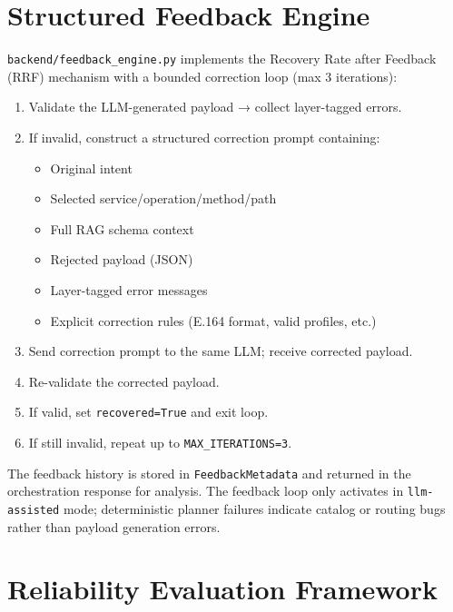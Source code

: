 \documentclass[conference]{IEEEtran}
\begin{document}
\section{Structured Feedback Engine}
\label{sec:feedback}

\texttt{backend/feedback\_engine.py} implements the Recovery Rate after
Feedback (RRF) mechanism with a bounded correction loop (max 3 iterations):

\begin{enumerate}[leftmargin=1.5em]
  \item Validate the LLM-generated payload → collect layer-tagged errors.
  \item If invalid, construct a structured correction prompt containing:
    \begin{itemize}[leftmargin=1.2em]
      \item Original intent
      \item Selected service/operation/method/path
      \item Full RAG schema context
      \item Rejected payload (JSON)
      \item Layer-tagged error messages
      \item Explicit correction rules (E.164 format, valid profiles, etc.)
    \end{itemize}
  \item Send correction prompt to the same LLM; receive corrected payload.
  \item Re-validate the corrected payload.
  \item If valid, set \texttt{recovered=True} and exit loop.
  \item If still invalid, repeat up to \texttt{MAX\_ITERATIONS=3}.
\end{enumerate}

The feedback history is stored in \texttt{FeedbackMetadata} and returned
in the orchestration response for analysis. The feedback loop only activates
in \texttt{llm-assisted} mode; deterministic planner failures indicate
catalog or routing bugs rather than payload generation errors.

\section{Reliability Evaluation Framework}
\label{sec:reliability}
\end{document}
